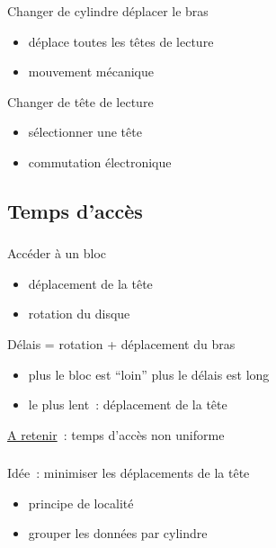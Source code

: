 \begin{frame}
\frametitle{\insertsubsection}
Changer de cylindre  \alert{déplacer} le bras 
\begin{itemize}
\item déplace toutes les têtes de lecture
\item mouvement mécanique
\end{itemize}

Changer de tête de lecture
\begin{itemize}
\item sélectionner une tête
\item commutation électronique
\end{itemize}
\end{frame}

\subsection{Temps d'accès}
\begin{frame}
  \frametitle{\insertsubsection}
  Accéder à un bloc 
  \begin{itemize}
  \item[\ding{212}] déplacement de la tête
  \item[\ding{212}] rotation du disque
  \end{itemize}
  \vspace{0.5cm}
  
  Délais = rotation + déplacement du bras
  \begin{itemize}
  \item plus le bloc est ``loin'' plus le délais est long
  \item le plus lent~: déplacement de la tête
  \end{itemize}
  \vspace{0.5cm}
  \underline{A retenir}~: temps d'accès \alert{non uniforme}
\end{frame}

\begin{frame}
  \frametitle{\insertsubsection}
  \large
  \alert{Idée~:} minimiser les déplacements de la tête
  \vspace{0.5cm}
  \begin{itemize}
  \item principe de \alert{localité}
  \item[\ding{212}] grouper les données par \alert{cylindre}
  \end{itemize}
  \normalsize
\end{frame}

